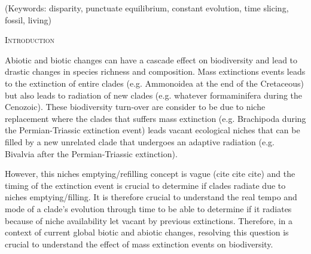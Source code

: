 \documentclass[12pt,letterpaper]{article}
\renewcommand{\section}[1]{%
\bigskip
\begin{center}
\begin{Large}
\normalfont\scshape #1
\medskip
\end{Large}
\end{center}}
\begin{document}
\noindent (Keywords: disparity, punctuate equilibrium, constant evolution, time slicing, fossil, living)\\

\vspace{1.5in}

\newpage 

%
%

\section{Introduction}



Abiotic and biotic changes can have a cascade effect on biodiversity and lead to drastic changes in species richness and composition. %
Mass extinctions events leads to the extinction of entire clades (e.g. Ammonoidea at the end of the Cretaceous) but also leads to radiation of new clades (e.g. whatever formaminifera \cite{Erwin1998344} during the Cenozoic).
These biodiversity turn-over are consider to be due to niche replacement where the clades that suffers mass extinction (e.g. Brachipoda during the Permian-Triassic extinction event) leads vacant ecological niches that can be filled by a new unrelated clade that undergoes an adaptive radiation (e.g. Bivalvia after the Permian-Triassic extinction).

However, this niches emptying/refilling concept is vague (cite cite cite) and the timing of the extinction event is crucial to determine if clades radiate due to niches emptying/filling.
It is therefore crucial to understand the real tempo and mode of a clade's evolution through time to be able to determine if it radiates because of niche availability let vacant by previous extinctions. Therefore, in a context of current global biotic and abiotic changes, resolving this question is crucial to understand the effect of mass extinction events on biodiversity.
\end{document}

